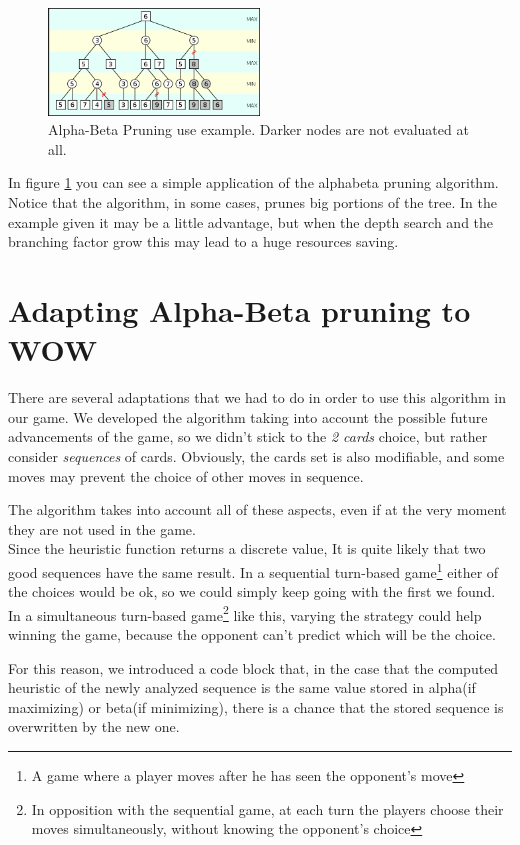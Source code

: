 \begin{figure}[htbp]
  \centering
    \includegraphics[width=0.5\textwidth]{images/alphabeta_pruning.png}
  \caption{Alpha-Beta Pruning use example. Darker nodes are not evaluated at all.}
  \label{fig:alphabeta_example}
\end{figure}

In figure \ref{fig:alphabeta_example} you can see a simple application of the alphabeta pruning algorithm. Notice that the algorithm, in some cases, prunes big portions of the tree. In the example given it may be a little advantage, but when the depth search and the branching factor grow this may lead to a huge resources saving.


\section{Adapting Alpha-Beta pruning to WOW}
There are several adaptations that we had to do in order to use this algorithm in our game.
We developed the algorithm taking into account the possible future advancements of the game, so we didn't stick to the \textit{2 cards} choice, but rather consider \textit{sequences} of cards.
Obviously, the cards set is also modifiable, and some moves may prevent the choice of other moves in sequence.

The algorithm takes into account all of these aspects, even if at the very moment they are not used in the game.\\

Since the heuristic function returns a discrete value, It is quite likely that two good sequences have the same result. In a sequential turn-based game\footnote{A game where a player moves after he has seen the opponent's move} either of the choices would be ok, so we could simply keep going with the first we found.
In a simultaneous turn-based game\footnote{In opposition with the sequential game, at each turn the players choose their moves simultaneously, without knowing the opponent's choice} like this, varying the strategy could help winning the game, because the opponent can't predict which will be the choice.

For this reason, we introduced a code block that, in the case that the computed heuristic of the newly analyzed sequence is the same value stored in alpha(if maximizing) or beta(if minimizing), there is a chance that the stored sequence is overwritten by the new one.
\vspace{2cm}


